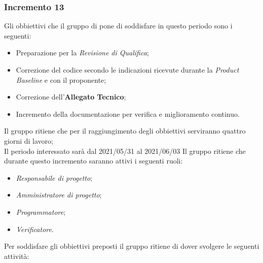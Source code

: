 \subsubsection{Incremento 13}
Gli obbiettivi che il gruppo di pone di soddisfare in questo periodo sono i seguenti:
\begin{itemize}
    \item Preparazione per la \textit{Revisione di Qualifica};
    \item Correzione del codice secondo le indicazioni ricevute durante la \textit{Product Baseline} e con il proponente;
    \item Correzione dell'\textbf{Allegato Tecnico};
    \item Incremento della documentazione per verifica e miglioramento continuo.
\end{itemize}
Il gruppo ritiene che per il raggiungimento degli obbiettivi serviranno quattro giorni di lavoro;\\
Il periodo interessato sarà dal 2021/05/31 al 2021/06/03
Il gruppo ritiene che durante questo incremento saranno attivi i seguenti ruoli:
\begin{itemize}
    \item \textit{Responsabile di progetto};
    \item \textit{Amministratore di progetto};
    \item \textit{Programmatore};
    \item \textit{Verificatore}.
\end{itemize}
Per soddisfare gli obbiettivi preposti il gruppo ritiene di dover svolgere le seguenti attività:
